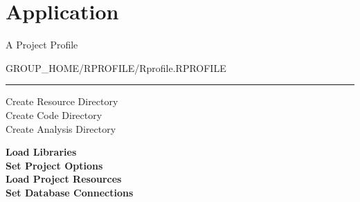 \documentclass{beamer}
\begin{document}
\section*{Application}

\begin{frame}{A Project Profile}

\begin{center} GROUP\_HOME/RPROFILE/Rprofile.RPROFILE\\ \end{center}
\begin{center}
\rule{4cm}{0.6pt}
\end{center}

\begin{center}
Create Resource Directory\\
Create Code Directory \\ 
Create Analysis Directory\\
\end{center}

\textbf{Load Libraries\\}
\textbf{Set Project Options\\}
\textbf{Load Project Resources\\}
\textbf{Set Database Connections\\}

\end{frame}
\end{document}
